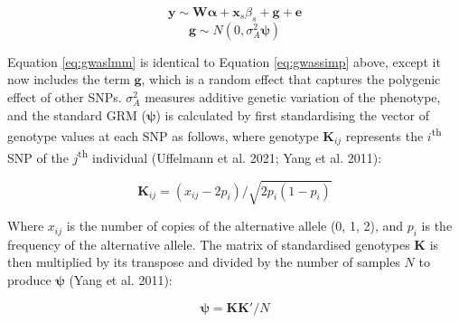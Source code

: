 \documentclass[
]{book}
\begin{document}
\begin{equation}
\pmb{y} \sim \pmb{W} \pmb{\alpha} + \pmb{x}_s\beta_s + \pmb{g} + \pmb{e} \label{eq:gwaslmm}
\end{equation}
\begin{equation}
\pmb{g} \sim N(0,\sigma^2_A\pmb{\psi}) \label{eq:gwaslmmg}
\end{equation}

Equation \eqref{eq:gwaslmm} is identical to Equation \eqref{eq:gwassimp} above, except it now includes the term \(\pmb{g}\), which is a random effect that captures the polygenic effect of other SNPs. \(\sigma^2_{A}\) measures additive genetic variation of the phenotype, and the standard GRM (\(\pmb{\psi}\)) is calculated by first standardising the vector of genotype values at each SNP as follows, where genotype \(\pmb{K}_{ij}\) represents the \(i\)\textsuperscript{th} SNP of the \(j\)\textsuperscript{th} individual (Uffelmann et al. 2021; Yang et al. 2011):

\begin{equation}
\pmb{K}_{ij} = (x_{ij} - 2p_i)/\sqrt{2p_i(1-p_i)} \label{eq:grmstd}
\end{equation}

Where \(x_{ij}\) is the number of copies of the alternative allele (0, 1, 2), and \(p_i\) is the frequency of the alternative allele. The matrix of standardised genotypes \(\pmb{K}\) is then multiplied by its transpose and divided by the number of samples \(N\) to produce \(\pmb{\psi}\) (Yang et al. 2011):

\begin{equation}
\pmb{\psi} = \pmb{K}\pmb{K}'/ N \label{eq:grm}
\end{equation}
\end{document}
